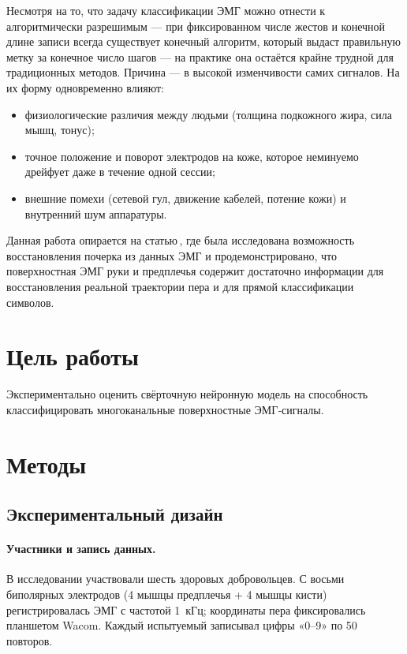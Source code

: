 \documentclass[a4paper,12pt]{article}
\begin{document}
Несмотря на то, что задачу классификации ЭМГ можно отнести к алгоритмически разрешимым — при фиксированном числе жестов и конечной длине записи всегда существует конечный алгоритм, который выдаст правильную метку за конечное число шагов — на практике она остаётся крайне трудной для традиционных методов. Причина — в высокой изменчивости самих сигналов. На их форму одновременно влияют:
\begin{itemize}
    \item физиологические различия между людьми (толщина подкожного жира, сила мышц, тонус);
    \item точное положение и поворот электродов на коже, которое неминуемо дрейфует даже в течение одной сессии;
    \item внешние помехи (сетевой гул, движение кабелей, потение кожи) и внутренний шум аппаратуры.
\end{itemize}

Данная работа опирается на статью\,\cite{linderman2009}, где была исследована возможность восстановления почерка из данных ЭМГ и продемонстрировано, что поверхностная ЭМГ руки и предплечья содержит достаточно информации для восстановления реальной траектории пера и для прямой классификации символов.

\newpage

\section{Цель работы}
Экспериментально оценить свёрточную нейронную модель на способность классифицировать многоканальные поверхностные ЭМГ‑сигналы.

\newpage

\section{Методы}

\subsection{Экспериментальный дизайн}

\paragraph{Участники и запись данных.} В исследовании участвовали шесть здоровых добровольцев. С восьми биполярных электродов (4 мышцы предплечья + 4 мышцы кисти) регистрировалась ЭМГ с частотой 1~кГц; координаты пера фиксировались планшетом Wacom. Каждый испытуемый записывал цифры «0–9» по 50 повторов.
\end{document}
